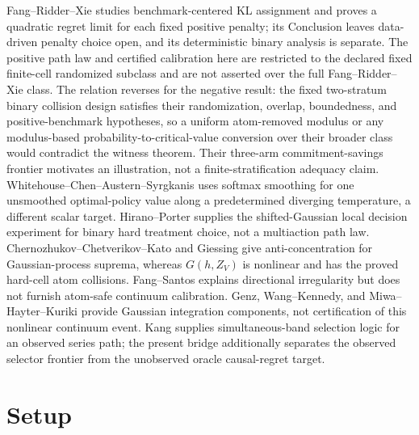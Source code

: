 \documentclass{article}
\begin{document}
Fang--Ridder--Xie studies benchmark-centered KL assignment and proves a quadratic regret limit for each fixed positive penalty; its Conclusion leaves data-driven penalty choice open, and its deterministic binary analysis is separate. The positive path law and certified calibration here are restricted to the declared fixed finite-cell randomized subclass and are not asserted over the full Fang--Ridder--Xie class. The relation reverses for the negative result: the fixed two-stratum binary collision design satisfies their randomization, overlap, boundedness, and positive-benchmark hypotheses, so a uniform atom-removed modulus or any modulus-based probability-to-critical-value conversion over their broader class would contradict the witness theorem. Their three-arm commitment-savings frontier motivates an illustration, not a finite-stratification adequacy claim. Whitehouse--Chen--Austern--Syrgkanis uses softmax smoothing for one unsmoothed optimal-policy value along a predetermined diverging temperature, a different scalar target. Hirano--Porter supplies the shifted-Gaussian local decision experiment for binary hard treatment choice, not a multiaction path law. Chernozhukov--Chetverikov--Kato and Giessing give anti-concentration for Gaussian-process suprema, whereas \(G(h,Z_V)\) is nonlinear and has the proved hard-cell atom collisions. Fang--Santos explains directional irregularity but does not furnish atom-safe continuum calibration. Genz, Wang--Kennedy, and Miwa--Hayter--Kuriki provide Gaussian integration components, not certification of this nonlinear continuum event. Kang supplies simultaneous-band selection logic for an observed series path; the present bridge additionally separates the observed selector frontier from the unobserved oracle causal-regret target.

\section{Setup}
\end{document}
